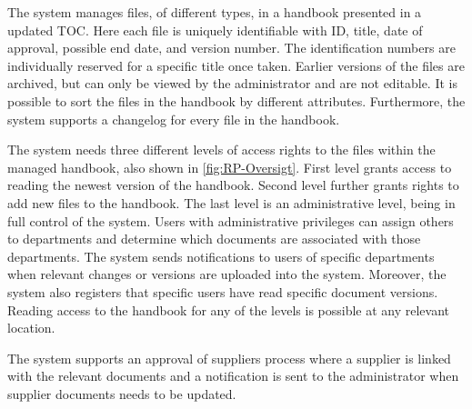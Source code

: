 The system manages files, of different types, in a handbook presented in a updated TOC.
Here each file is uniquely identifiable with ID, title, date of approval, possible end date, and version number.
The identification numbers are individually reserved for a specific title once taken.
Earlier versions of the files are archived, but can only be viewed by the administrator and are not editable.
It is possible to sort the files in the handbook by different attributes.
Furthermore, the system supports a changelog for every file in the handbook.

The system needs three different levels of access rights to the files within the managed handbook, also shown in \cref{fig:RP-Oversigt}.
First level grants access to reading the newest version of the handbook.
Second level further grants rights to add new files to the handbook.
The last level is an administrative level, being in full control of the system.
Users with administrative privileges can assign others to departments and determine which documents are associated with those departments.
The system sends notifications to users of specific departments when relevant changes or versions are uploaded into the system.
Moreover, the system also registers that specific users have read specific document versions.
Reading access to the handbook for any of the levels is possible at any relevant location.

The system supports an approval of suppliers process where a supplier is linked with the relevant documents and a notification is sent to the administrator when supplier documents needs to be updated.
